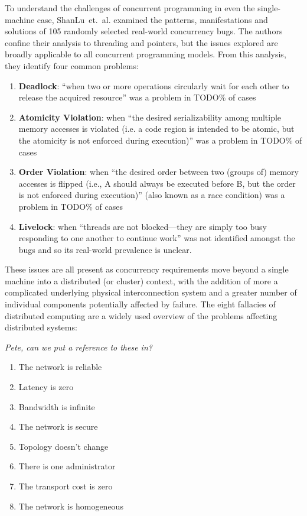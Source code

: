 \documentclass{sig-alternate}
\begin{document}
To understand the challenges of concurrent programming in even the
single-machine case,
ShanLu~et.~al.\cite{shanlu08:_learn_mistak_compr_study_real} examined
the patterns, manifestations and solutions of 105 randomly selected
real-world concurrency bugs. The authors confine their analysis to
threading and pointers, but the issues explored are broadly applicable
to all concurrent programming models. From this analysis, they
identify four common problems:

\begin{enumerate}
\item \textbf{Deadlock}: ``when two or more operations circularly wait for
each other to release the acquired resource'' was a problem in TODO\%
of cases

\item \textbf{Atomicity Violation}: when ``the desired serializability
  among multiple memory accesses is violated (i.e. a code region is
  intended to be atomic, but the atomicity is not enforced during
  execution)'' was a problem in TODO\% of cases

\item \textbf{Order Violation}: when ``the desired order between two
  (groups of) memory accesses is flipped (i.e., A should always be
  executed before B, but the order is not enforced during execution)''
  (also known as a race condition) was a problem in TODO\% of cases

\item \textbf{Livelock}: when ``threads are not blocked---they are
  simply too busy responding to one another to continue work'' was not
  identified amongst the bugs and so its real-world prevalence is
  unclear.
\end{enumerate}

These issues are all present as concurrency requirements move beyond a
single machine into a distributed (or cluster) context, with the
addition of more a complicated underlying physical interconnection
system and a greater number of individual components potentially
affected by failure. The eight fallacies of distributed computing are
a widely used overview of the problems affecting distributed systems:

\emph{Pete, can we put a reference to these in?}

\begin{enumerate}
\item The network is reliable
\item Latency is zero
\item Bandwidth is infinite
\item The network is secure
\item Topology doesn't change
\item There is one administrator
\item The transport cost is zero
\item The network is homogeneous
\end{enumerate}
\end{document}
